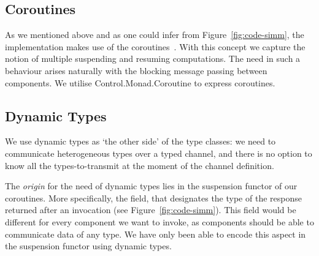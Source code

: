 \subsection{Coroutines}
\label{sec:impl-coroutines}
As we mentioned above and as one could infer from Figure~\ref{fig:code-simm}, the implementation makes use of the coroutines~\cite{coroutines}.
With this concept we capture the notion of multiple suspending and resuming computations.
The need in such a behaviour arises naturally with the blocking message passing between components.
We utilise \textsf{Control.Monad.Coroutine} \cite{cmt} to express coroutines.

\subsection{Dynamic Types}
We use dynamic types \cite{Abadi:1991:DTS:103135.103138} as `the other side' of the type classes: we need to communicate heterogeneous types over a typed channel, and there is no option to know all the types-to-transmit at the moment of the channel definition.

The \emph{origin} for the need of dynamic types lies in the suspension functor of our coroutines.
More specifically, the  field, that designates the type of the response returned after an invocation (see Figure~\ref{fig:code-simm}).
This field would be different for every component we want to invoke, as components should be able to communicate data of any type. %
We have only been able to encode this aspect in the suspension functor using dynamic types.



